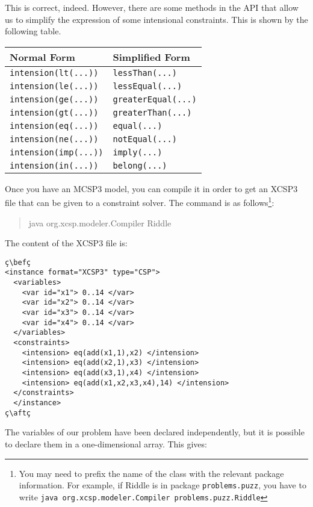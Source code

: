 \documentclass[10pt]{article}
\def\xt{{\rm XCSP3}\xspace}
\def\mt{{\rm MCSP3}\xspace}
\def\xt{{\rm XCSP3}\xspace}
\newenvironment{myvb}{\endgraf\small\verbatim}{\endverbatim}
\def\bef{\rule{10cm}{0.1mm}} %
\def\aft{\rule{10cm}{0.1mm}\medskip}
\begin{document}
This is correct, indeed.
However, there are some methods in the API that allow us to simplify the expression of some intensional constraints.
This is shown by the following table.

\medskip\begin{tabular}{ll}
  \toprule
Normal Form & Simplified Form \\
  \midrule
  \verb!intension(lt(...))! & \verb!lessThan(...)!  \\
  \verb!intension(le(...))! & \verb!lessEqual(...)!  \\
  \verb!intension(ge(...))! & \verb!greaterEqual(...)!  \\
  \verb!intension(gt(...))! & \verb!greaterThan(...)!  \\
  \verb!intension(eq(...))! & \verb!equal(...)!  \\
  \verb!intension(ne(...))! & \verb!notEqual(...)!  \\
  \verb!intension(imp(...))! & \verb!imply(...)!  \\
 \verb!intension(in(...))! & \verb!belong(...)!  \\
\bottomrule
\end{tabular}
\bigskip

Once you have an \mt model, you can compile it in order to get an \xt file that can be given to a constraint solver.
The command is as follows\footnote{You may need to prefix the name of the class with the relevant package information. For example, if Riddle is in package \texttt{problems.puzz}, you have to write \texttt{java org.xcsp.modeler.Compiler problems.puzz.Riddle}}:
\begin{quote}
\begin{myvb}
java org.xcsp.modeler.Compiler Riddle
\end{myvb}
\end{quote}
The content of the \xt file is: 
\begin{lstlisting}
ç\befç
<instance format="XCSP3" type="CSP">
  <variables>
    <var id="x1"> 0..14 </var>
    <var id="x2"> 0..14 </var>
    <var id="x3"> 0..14 </var>
    <var id="x4"> 0..14 </var>
  </variables>
  <constraints>
    <intension> eq(add(x1,1),x2) </intension>
    <intension> eq(add(x2,1),x3) </intension>
    <intension> eq(add(x3,1),x4) </intension>
    <intension> eq(add(x1,x2,x3,x4),14) </intension>
  </constraints>
  </instance>
ç\aftç
\end{lstlisting}

The variables of our problem have been declared independently, but it is possible to declare them in a one-dimensional array.
This gives:
\end{document}
